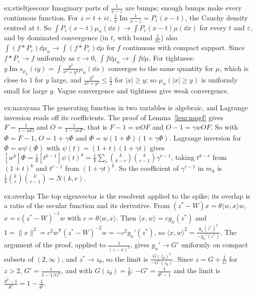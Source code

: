 \begin{solution}{ex:stieltjesconv}
\idea Imaginary parts of $\frac1{x-z}$ are bumps; enough bumps make every continuous function.
\writeup For $z=t+i\varepsilon$, $\frac1\pi\operatorname{Im}\frac1{x-z}=P_\varepsilon(x-t)$, the Cauchy density centred at $t$. So $\int P_\varepsilon(x-t)\mu_n(\dd x)\to\int P_\varepsilon(x-t)\mu(\dd x)$ for every $t$ and $\varepsilon$, and by dominated convergence (in $t$, with
bound $\frac1{\pi\varepsilon}$) also $\int(f*P_\varepsilon)\dd\mu_n\to\int(f*P_\varepsilon)\dd\mu$ for $f$ continuous with compact support. Since $f*P_\varepsilon\to f$ uniformly as $\varepsilon\to0$, $\int f\dd\mu_n\to\int f\dd\mu$. For tightness:
$y\operatorname{Im}s_{\mu_n}(iy)=\int\frac{y^2}{x^2+y^2}\mu_n(\dd x)$ converges to the same quantity for $\mu$, which is close to $1$ for $y$ large, and $\frac{y^2}{x^2+y^2}\le\frac12$ for $|x|\ge y$; so $\mu_n(|x|\ge y)$ is uniformly small
for large $y$. Vague convergence and tightness give weak convergence.
\end{solution}

\begin{solution}{ex:narayana}
\idea The generating function in two variables is algebraic, and Lagrange inversion reads off its coefficients.
\writeup The proof of Lemma~\ref{lem:mpgf} gives $F=\frac1{1-wO}$ and $O=\frac1{1-\gamma wF}$, that is $F-1=wOF$ and $O-1=\gamma wOF$. So with $\Phi=F-1$, $O=1+\gamma\Phi$ and $\Phi=w(1+\Phi)(1+\gamma\Phi)$. Lagrange inversion for $\Phi=w\psi(\Phi)$ with $\psi(t)=(1+t)(1+\gamma t)$ gives $[w^k]\Phi=\frac1k[t^{k-1}]\psi(t)^k=\frac1k\sum_{r}\binom k{k-r}\binom k{r-1}\gamma^{r-1}$, taking $t^{k-r}$ from $(1+t)^k$ and $t^{r-1}$ from
$(1+\gamma t)^k$. So the coefficient of $\gamma^{r-1}$ in $m_k$ is $\frac1k\binom kr\binom k{r-1}=N(k,r)$.
\end{solution}

\begin{solution}{ex:overlap}
\idea The top eigenvector is the resolvent applied to the spike; its overlap is a ratio of the secular function and its derivative.
\writeup From $(z^*-W)x=\theta\langle w,x\rangle w$, $x=c(z^*-W)^{-1}w$ with $c=\theta\langle w,x\rangle$. Then $\langle x,w\rangle=cg_n(z^*)$ and $1=\|x\|^2=c^2w^{\mathsf T}(z^*-W)^{-2}w=-c^2g_n'(z^*)$, so
$\langle x,w\rangle^2=\frac{g_n(z^*)^2}{-g_n'(z^*)}$. The argument of the proof, applied to $\frac1{(z-x)^2}$, gives $g_n'\to G'$ uniformly on compact subsets of $(2,\infty)$, and $z^*\to z_\theta$, so the limit is
$\frac{G(z_\theta)^2}{-G'(z_\theta)}$. Since $z=G+\frac1G$ for $z>2$, $G'=\frac1{1-1/G^2}$, and with $G(z_\theta)=\frac1\theta$: $-G'=\frac1{\theta^2-1}$ and the limit is $\frac{\theta^2-1}{\theta^2}=1-\frac1{\theta^2}$.
\end{solution}

